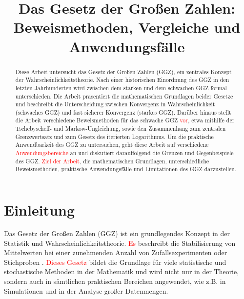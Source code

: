 \documentclass[aodsor,preprint]{imsart}
\numberwithin{equation}{section}
\theoremstyle{plain}
\begin{document}
\begin{frontmatter}
\title{Das Gesetz der Großen Zahlen: Beweismethoden,
Vergleiche und Anwendungsfälle}


\begin{aug}
\author{ }




\end{aug}

\begin{abstract}
    Diese Arbeit untersucht das Gesetz der Großen Zahlen (GGZ), ein zentrales Konzept der Wahrscheinlichkeitstheorie.
    Nach einer historischen Einordnung des GGZ in den letzten Jahrhunderten wird zwischen dem starken und dem schwachen GGZ formal unterschieden.
    Die Arbeit präsentiert die mathematischen Grundlagen beider Gesetze und beschreibt die Unterscheidung zwischen Konvergenz in Wahrscheinlichkeit (schwaches GGZ) und fast sicherer Konvergenz (starkes GGZ).
    Darüber hinaus stellt die Arbeit verschiedene Beweismethoden für das schwache GGZ \textcolor{red}{vor}, etwa mithilfe der Tschebyscheff- und Markow-Ungleichung, sowie den Zusammenhang zum zentralen Grenzwertsatz und zum Gesetz des iterierten Logarithmus.
    Um die praktische Anwendbarkeit des GGZ zu untersuchen, geht diese Arbeit auf verschiedene \textcolor{red}{Anwendungsbereiche} an und diskutiert darauffolgend die Grenzen und Gegenbeispiele des GGZ.
    \textcolor{red}{Ziel der Arbeit}, die mathematischen Grundlagen, unterschiedliche Beweismethoden, praktische Anwendungsfälle und Limitationen des GGZ darzustellen.
\end{abstract}

\begin{keyword}[class=MSC]
\end{keyword}

\begin{keyword}
\kwd{\LaTeXe}
\end{keyword}

\end{frontmatter}

\section{Einleitung}
\label{sec:einleitung}
Das Gesetz der Großen Zahlen (GGZ) ist ein grundlegendes Konzept in der Statistik und Wahrscheinlichkeitstheorie.
\textcolor{red}{Es} beschreibt die Stabilisierung von Mittelwerten bei einer zunehmenden Anzahl von Zufallsexperimenten oder Stichproben \citep{degroot2021}.
\textcolor{red}{Dieses Gesetz} bildet die Grundlage für viele statistische und stochastische Methoden in der Mathematik und wird nicht nur in der Theorie, sondern auch in sämtlichen praktischen Bereichen angewendet, wie z.B. in Simulationen und in der Analyse großer Datenmengen.
\end{document}
